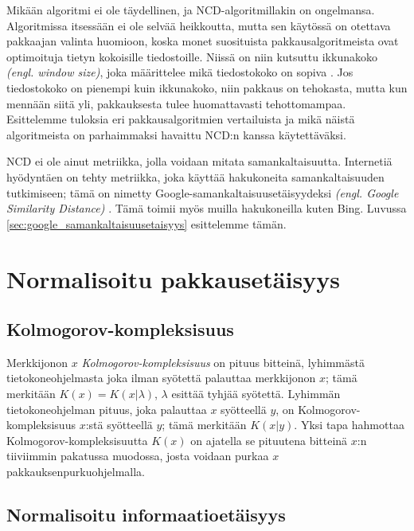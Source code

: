 \documentclass[12pt,finnish]{tktltiki2}
\theoremstyle{definition}
\theoremstyle{remark}
\newcommand{\engl}[1]{\emph{(engl. #1)}}
\newcommand{\kolmogorov}{Kolmogorov-kompleksisuus}
\begin{document}
  Mikään algoritmi ei ole täydellinen, ja NCD-algoritmillakin on ongelmansa.
  Algoritmissa itsessään ei ole selvää heikkoutta, mutta sen käytössä on otettava pakkaajan valinta huomioon, koska monet suosituista pakkausalgoritmeista ovat optimoituja tietyn kokoisille tiedostoille.
  Niissä on niin kutsuttu ikkunakoko \engl{window size}, joka määrittelee mikä tiedostokoko on sopiva \cite{cebrian2005common}.
  Jos tiedostokoko on pienempi kuin ikkunakoko, niin pakkaus on tehokasta, mutta kun mennään siitä yli, pakkauksesta tulee huomattavasti tehottomampaa.
  Esittelemme tuloksia eri pakkausalgoritmien vertailuista ja mikä näistä algoritmeista on parhaimmaksi havaittu NCD:n kanssa käytettäväksi.


\label{par:intro-5}
  NCD ei ole ainut metriikka, jolla voidaan mitata samankaltaisuutta.
  Internetiä hyödyntäen on tehty metriikka, joka käyttää hakukoneita samankaltaisuuden tutkimiseen; tämä on nimetty Google-samankaltaisuusetäisyydeksi \engl{Google Similarity Distance} \cite{cilibrasi2007google}.
  Tämä toimii myös muilla hakukoneilla kuten Bing. Luvussa \ref{sec:google_samankaltaisuusetaisyys} esittelemme tämän.


\section{Normalisoitu pakkausetäisyys} %
\label{sec:normalisoitu_pakkausetaisyys}
  \subsection{\kolmogorov} %
\label{sub:kolmogorov_kompleksisuus}

  Merkkijonon $x$ \emph{\kolmogorov} on pituus bitteinä, lyhimmästä tietokoneohjelmasta joka ilman syötettä palauttaa merkkijonon $x$; tämä merkitään $K(x)=K(x|\lambda)$, $\lambda$ esittää tyhjää syötettä.
  Lyhimmän tietokoneohjelman pituus, joka palauttaa $x$ syötteellä $y$, on \kolmogorov{} $x$:stä syötteellä $y$; tämä merkitään $K(x|y)$.
  Yksi tapa hahmottaa Kolmogorov-kompleksisuutta $K(x)$ on ajatella se pituutena bitteinä $x$:n tiiviimmin pakatussa muodossa, josta voidaan purkaa $x$ pakkauksenpurkuohjelmalla.

\subsection{Normalisoitu informaatioetäisyys} %
\label{sub:normalisoitu_informaatioetaisyys}
\end{document}
